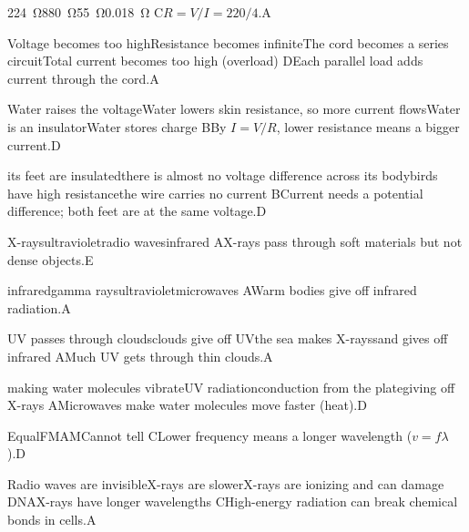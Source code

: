 \begin{gradebody}
{\SI{224}{\ohm}}{\SI{880}{\ohm}}{\SI{55}{\ohm}}{\SI{0.018}{\ohm}}
{C}{$R = V/I = 220/4$.}{A}

{Voltage becomes too high}{Resistance becomes infinite}{The cord becomes a series circuit}{Total current becomes too high (overload)}
{D}{Each parallel load adds current through the cord.}{A}

{Water raises the voltage}{Water lowers skin resistance, so more current flows}{Water is an insulator}{Water stores charge}
{B}{By $I = V/R$, lower resistance means a bigger current.}{D}

{its feet are insulated}{there is almost no voltage difference across its body}{birds have high resistance}{the wire carries no current}
{B}{Current needs a potential difference; both feet are at the same voltage.}{D}

{X-rays}{ultraviolet}{radio waves}{infrared}
{A}{X-rays pass through soft materials but not dense objects.}{E}

{infrared}{gamma rays}{ultraviolet}{microwaves}
{A}{Warm bodies give off infrared radiation.}{A}

{UV passes through clouds}{clouds give off UV}{the sea makes X-rays}{sand gives off infrared}
{A}{Much UV gets through thin clouds.}{A}

{making water molecules vibrate}{UV radiation}{conduction from the plate}{giving off X-rays}
{A}{Microwaves make water molecules move faster (heat).}{D}

{Equal}{FM}{AM}{Cannot tell}
{C}{Lower frequency means a longer wavelength ($v = f\lambda$).}{D}

{Radio waves are invisible}{X-rays are slower}{X-rays are ionizing and can damage DNA}{X-rays have longer wavelengths}
{C}{High-energy radiation can break chemical bonds in cells.}{A}


\end{gradebody}
